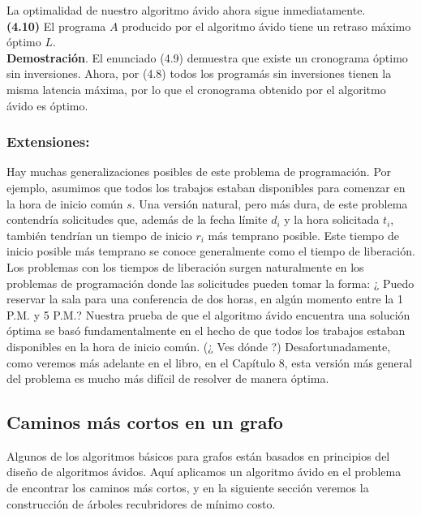 \documentclass[a4paper, 12pt]{book}
\begin{document}
La optimalidad de nuestro algoritmo ávido ahora sigue inmediatamente.\\

\textbf{(4.10)} El programa $A$ producido por el algoritmo ávido tiene un retraso máximo óptimo $L$.\\

\textbf{Demostración}. El enunciado (4.9) demuestra que existe un cronograma óptimo sin inversiones. Ahora, por (4.8) todos los programás sin inversiones tienen la misma latencia máxima, por lo que el cronograma obtenido por el algoritmo ávido es óptimo.\\

\subsubsection*{Extensiones:}
Hay muchas generalizaciones posibles de este problema de programación. Por ejemplo, asumimos que todos los trabajos estaban disponibles para comenzar en la hora de inicio común $s$. Una versión natural, pero más dura, de este problema contendría solicitudes que, además de la fecha límite $d_i$ y la hora solicitada $t_i$, también tendrían un tiempo de inicio $r_i$ más temprano posible. Este tiempo de inicio posible más temprano se conoce generalmente como el tiempo de liberación. Los problemas con los tiempos de liberación surgen naturalmente en los problemas de programación donde las solicitudes pueden tomar la forma: ¿ Puedo reservar la sala para una conferencia de dos horas, en algún momento entre la 1 P.M. y 5 P.M.? Nuestra prueba de que el algoritmo ávido encuentra una solución óptima se basó fundamentalmente en el hecho de que todos los trabajos estaban disponibles en la hora de inicio común. (¿ Ves dónde ?) Desafortunadamente, como veremos más adelante en el libro, en el Capítulo 8, esta versión más general del problema es mucho más difícil de resolver de manera óptima.\\




\subsection{Caminos más cortos en un grafo}

Algunos de los algoritmos básicos para grafos están basados en principios del diseño de algoritmos ávidos. Aquí aplicamos un algoritmo ávido en el problema de encontrar los caminos más cortos, y en la siguiente sección veremos la construcción de árboles recubridores de mínimo costo.\\\\
\end{document}
